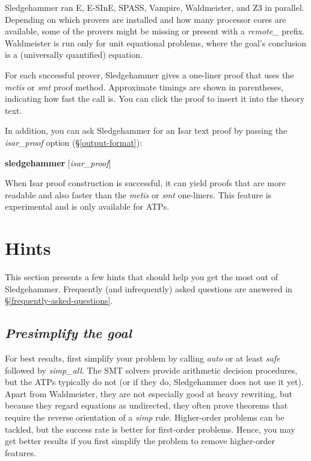 \documentclass[a4paper,12pt]{article}
\begin{document}
Sledgehammer ran E, E-SInE, SPASS, Vampire, Waldmeister, and Z3 in parallel.
Depending on which provers are installed and how many processor cores are
available, some of the provers might be missing or present with a
\textit{remote\_} prefix. Waldmeister is run only for unit equational problems,
where the goal's conclusion is a (universally quantified) equation.

For each successful prover, Sledgehammer gives a one-liner proof that uses
the \textit{metis} or \textit{smt} proof method. Approximate timings are shown
in parentheses, indicating how fast the call is. You can click the proof to
insert it into the theory text.

In addition, you can ask Sledgehammer for an Isar text proof by passing the
\textit{isar\_proof} option (\S\ref{output-format}):

\prew
\textbf{sledgehammer} [\textit{isar\_proof}]
\postw

When Isar proof construction is successful, it can yield proofs that are more
readable and also faster than the \textit{metis} or \textit{smt} one-liners.
This feature is experimental and is only available for ATPs.

\section{Hints}
\label{hints}

This section presents a few hints that should help you get the most out of
Sledgehammer. Frequently (and infrequently) asked questions are answered in
\S\ref{frequently-asked-questions}.

\newcommand\point[1]{\subsection{\emph{#1}}}

\point{Presimplify the goal}

For best results, first simplify your problem by calling \textit{auto} or at
least \textit{safe} followed by \textit{simp\_all}. The SMT solvers provide
arithmetic decision procedures, but the ATPs typically do not (or if they do,
Sledgehammer does not use it yet). Apart from Waldmeister, they are not
especially good at heavy rewriting, but because they regard equations as
undirected, they often prove theorems that require the reverse orientation of a
\textit{simp} rule. Higher-order problems can be tackled, but the success rate
is better for first-order problems. Hence, you may get better results if you
first simplify the problem to remove higher-order features.
\end{document}
